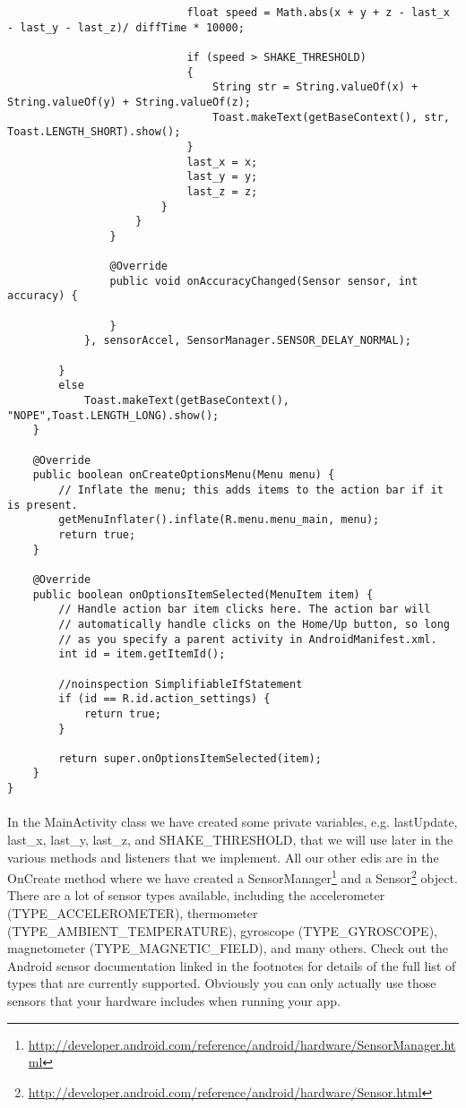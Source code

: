 \begin{lstlisting}
                            float speed = Math.abs(x + y + z - last_x - last_y - last_z)/ diffTime * 10000;

                            if (speed > SHAKE_THRESHOLD)
                            {
                                String str = String.valueOf(x) + String.valueOf(y) + String.valueOf(z);
                                Toast.makeText(getBaseContext(), str, Toast.LENGTH_SHORT).show();
                            }
                            last_x = x;
                            last_y = y;
                            last_z = z;
                        }
                    }
                }

                @Override
                public void onAccuracyChanged(Sensor sensor, int accuracy) {

                }
            }, sensorAccel, SensorManager.SENSOR_DELAY_NORMAL);

        }
        else
            Toast.makeText(getBaseContext(), "NOPE",Toast.LENGTH_LONG).show();
    }

    @Override
    public boolean onCreateOptionsMenu(Menu menu) {
        // Inflate the menu; this adds items to the action bar if it is present.
        getMenuInflater().inflate(R.menu.menu_main, menu);
        return true;
    }

    @Override
    public boolean onOptionsItemSelected(MenuItem item) {
        // Handle action bar item clicks here. The action bar will
        // automatically handle clicks on the Home/Up button, so long
        // as you specify a parent activity in AndroidManifest.xml.
        int id = item.getItemId();

        //noinspection SimplifiableIfStatement
        if (id == R.id.action_settings) {
            return true;
        }

        return super.onOptionsItemSelected(item);
    }
}
\end{lstlisting}

\paragraph{} In the MainActivity class we have created some private variables, e.g. lastUpdate, last\_x, last\_y, last\_z, and SHAKE\_THRESHOLD, that we will use later in the various methods and listeners that we implement. All our other edis are in the OnCreate method where we have created a SensorManager\footnote{\url{http://developer.android.com/reference/android/hardware/SensorManager.html}} and a Sensor\footnote{\url{http://developer.android.com/reference/android/hardware/Sensor.html}} object. There are a lot of sensor types available, including the accelerometer (TYPE\_ACCELEROMETER), thermometer (TYPE\_AMBIENT\_TEMPERATURE), gyroscope (TYPE\_GYROSCOPE), magnetometer (TYPE\_MAGNETIC\_FIELD), and many others. Check out the Android sensor documentation linked in the footnotes for details of the full list of types that are currently supported. Obviously you can only actually use those sensors that your hardware includes when running your app.
